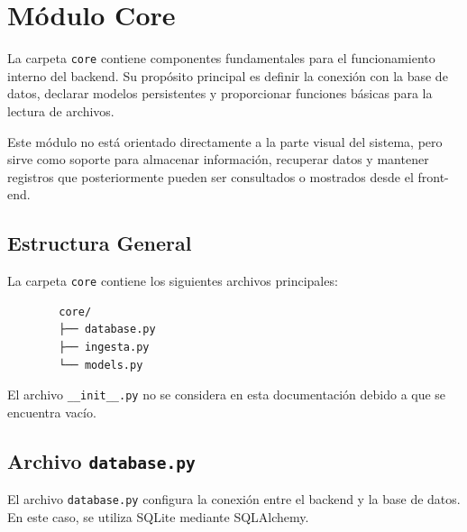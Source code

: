 \documentclass[12pt]{article}
\begin{document}
	
	\section{Módulo Core}
	
	La carpeta \texttt{core} contiene componentes fundamentales para el funcionamiento interno del backend. Su propósito principal es definir la conexión con la base de datos, declarar modelos persistentes y proporcionar funciones básicas para la lectura de archivos.
	
	Este módulo no está orientado directamente a la parte visual del sistema, pero sirve como soporte para almacenar información, recuperar datos y mantener registros que posteriormente pueden ser consultados o mostrados desde el front-end.
	
	\subsection{Estructura General}
	
	La carpeta \texttt{core} contiene los siguientes archivos principales:
	
	\begin{verbatim}
		core/
		├── database.py
		├── ingesta.py
		└── models.py
	\end{verbatim}
	
	El archivo \texttt{\_\_init\_\_.py} no se considera en esta documentación debido a que se encuentra vacío.
	
	\subsection{Archivo \texttt{database.py}}
	
	El archivo \texttt{database.py} configura la conexión entre el backend y la base de datos. En este caso, se utiliza SQLite mediante SQLAlchemy.
	
\end{document}
